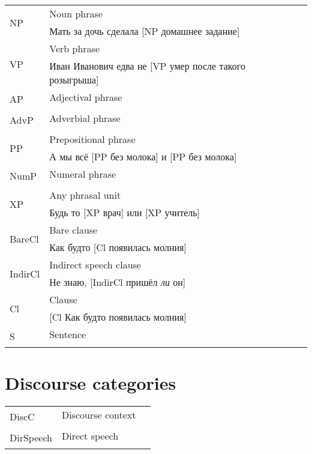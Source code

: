 \documentclass[a4paper,11pt, onecolumn,twoside]{article}
\begin{document}
\begin{tabular}{lll}

\multirow{2}{*}{NP} & Noun phrase & \\
                    & Мать за дочь сделала [NP домашнее задание] & \\
\multirow{2}{*}{VP} & Verb phrase & \\
                    & Иван Иванович едва не [VP умер после такого розыгрыша] & \\
\multirow{2}{*}{AP} & Adjectival phrase & \\
                    & & \\
\multirow{2}{*}{AdvP} & Adverbial phrase & \\
                    & & \\
\multirow{2}{*}{PP} & Prepositional phrase & \\
                    & А мы всё [PP без молока] и [PP без молока] & \\
\multirow{2}{*}{NumP} & Numeral phrase & \\
                    & & \\
\multirow{2}{*}{XP} & Any phrasal unit & \\
                    & Будь то [XP врач] или [XP учитель] & \\
\multirow{2}{*}{BareCl} & Bare clause & \\
                    & Как будто [Cl появилась молния] & \\
\multirow{2}{*}{IndirCl} & Indirect speech clause & \\
                    & Не знаю, [IndirCl пришёл \emph{ли} он] & \\
\multirow{2}{*}{Cl} & Clause & \\
                    & [Cl Как будто появилась молния] & \\
\multirow{2}{*}{S} & Sentence & \\
                    & & \\
\end{tabular}

\section{Discourse categories}

\begin{tabular}{lll}
\multirow{2}{*}{DiscC} & Discourse context & \\
                    & & \\
\multirow{2}{*}{DirSpeech} & Direct speech & \\
                    & & \\
\end{tabular}
\end{document}
